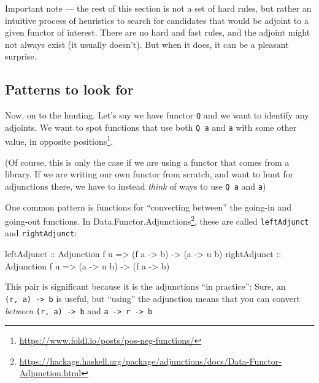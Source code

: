 \documentclass[]{article}
\newenvironment{Shaded}{}{}
\newcommand{\DataTypeTok}[1]{\textcolor[rgb]{0.56,0.13,0.00}{#1}}
\newcommand{\NormalTok}[1]{#1}
\newcommand{\OtherTok}[1]{\textcolor[rgb]{0.00,0.44,0.13}{#1}}
\renewcommand{\href}[2]{#2\footnote{\url{#1}}}
\begin{document}
Important note --- the rest of this section is not a set of hard rules, but
rather an intuitive process of heuristics to search for candidates that would be
adjoint to a given functor of interest. There are no hard and fast rules, and
the adjoint might not always exist (it usually doesn't). But when it does, it
can be a pleasant surprise.

\subsection{Patterns to look for}\label{patterns-to-look-for}

Now, on to the hunting. Let's say we have functor \texttt{Q} and we want to
identify any adjoints. We want to spot functions that use both \texttt{Q\ a} and
\texttt{a} with some other value, in
\href{https://www.foldl.io/posts/pos-neg-functions/}{opposite positions}.

(Of course, this is only the case if we are using a functor that comes from a
library. If we are writing our own functor from scratch, and want to hunt for
adjunctions there, we have to instead \emph{think} of ways to use \texttt{Q\ a}
and \texttt{a})

One common pattern is functions for ``converting between'' the going-in and
going-out functions. In
\href{https://hackage.haskell.org/package/adjunctions/docs/Data-Functor-Adjunction.html}{Data.Functor.Adjunctions},
these are called \texttt{leftAdjunct} and \texttt{rightAdjunct}:

\begin{Shaded}
\begin{Highlighting}[]
\OtherTok{leftAdjunct  ::} \DataTypeTok{Adjunction}\NormalTok{ f u }\OtherTok{=\textgreater{}}\NormalTok{ (f a }\OtherTok{{-}\textgreater{}}\NormalTok{ b) }\OtherTok{{-}\textgreater{}}\NormalTok{ (a }\OtherTok{{-}\textgreater{}}\NormalTok{ u b)}
\OtherTok{rightAdjunct ::} \DataTypeTok{Adjunction}\NormalTok{ f u }\OtherTok{=\textgreater{}}\NormalTok{ (a }\OtherTok{{-}\textgreater{}}\NormalTok{ u b) }\OtherTok{{-}\textgreater{}}\NormalTok{ (f a }\OtherTok{{-}\textgreater{}}\NormalTok{ b)}
\end{Highlighting}
\end{Shaded}

This pair is significant because it is the adjunctions ``in practice'': Sure, an
\texttt{(r,\ a)\ -\textgreater{}\ b} is useful, but ``using'' the adjunction
means that you can convert \emph{between} \texttt{(r,\ a)\ -\textgreater{}\ b}
and \texttt{a\ -\textgreater{}\ r\ -\textgreater{}\ b}
\end{document}
